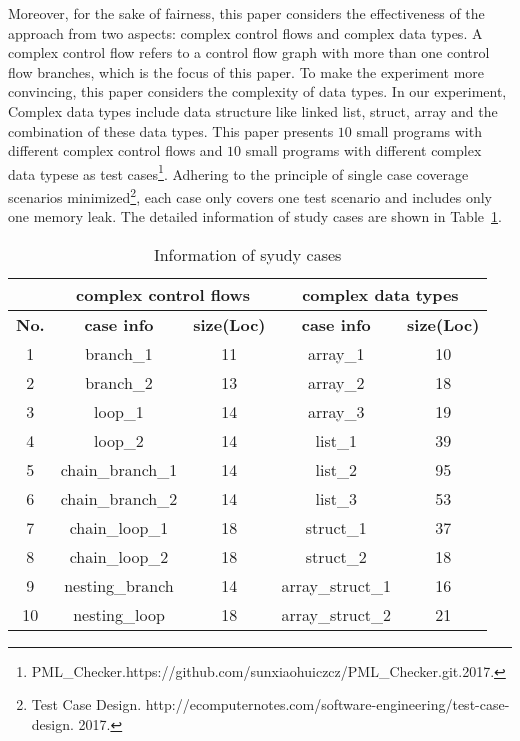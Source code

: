 Moreover, for the sake of fairness, this paper considers the effectiveness of the approach from two aspects: complex control flows and complex data types. A complex control flow refers to a control flow graph with more than one control flow branches, which is the focus of this paper. To make the experiment more convincing, this paper considers the complexity of data types. In our experiment, Complex data types include data structure like linked list, struct, array and the combination of these data types. This paper presents $10$ small programs with different complex control flows and $10$ small programs with different complex data typese as test cases\protect\footnote{PML\_Checker.https://github.com/sunxiaohuiczcz/PML\_Checker.git.2017.}. Adhering to the principle of single case coverage scenarios minimized\footnote{Test Case Design. http://ecomputernotes.com/software-engineering/test-case-design. 2017.}, each case only covers one test scenario and includes only one memory leak.
The detailed information of study cases are shown in Table~\ref{tab:2}.
%
\begin{table}[!h]
\center
\caption{Information of syudy cases}\label{tab:2}
\begin{tabular}{|c|c|c|c|c|}
\hline
&\multicolumn{2}{|c|}{\textbf{complex control flows}} & \multicolumn{2}{|c|}{\textbf{complex data types}}\\
\hline
\textbf{No.} & \textbf{case info} & \textbf{size(Loc)} & \textbf{case info} & \textbf{size(Loc)}\\
\hline
1 & branch\_1 & 11 & array\_1 & 10\\
\hline
2 & branch\_2 & 13 & array\_2 &	18\\
\hline
3 & loop\_1 & 14 & array\_3 & 19\\
\hline
4 & loop\_2 & 14 &	list\_1 &	39\\
\hline
5 & chain\_branch\_1 & 14 &	list\_2 &	95\\
\hline
6 & chain\_branch\_2 & 14 &	list\_3 &	53\\
\hline
7 &  chain\_loop\_1 & 18 &	struct\_1 &	37\\
\hline
8 & chain\_loop\_2 & 18 &	struct\_2 &	18\\
\hline
9 &	nesting\_branch & 14 &array\_struct\_1 &	16\\
\hline
10 & nesting\_loop & 18 & array\_struct\_2 &	21\\
\hline
\end{tabular}
\end{table}
%
